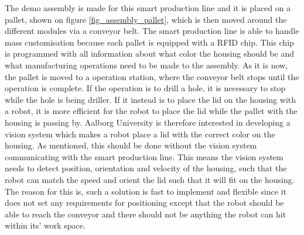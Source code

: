The demo assembly is made for this smart production line and it is placed on a pallet, shown on figure \ref{fig_assembly_pallet}, which is then moved around the different modules via a conveyor belt. The smart production line is able to handle mass customisation because each pallet is equipped with a RFID chip. This chip is programmed with all information about what color the housing should be and what manufacturing operations need to be made to the assembly. As it is now, the pallet is moved to a operation station, where the conveyor belt stops until the operation is complete. If the operation is to drill a hole, it is necessary to stop while the hole is being driller. If it instead is to place the lid on the housing with a robot, it is more efficient for the robot to place the lid while the pallet with the housing is passing by. Aalborg University is therefore interested in developing a vision system which makes a robot place a lid with the correct color on the housing. As mentioned, this should be done without the vision system communicating with the smart production line. This means the vision system needs to detect position, orientation and velocity of the housing, such that the robot can match the speed and orient the lid such that it will fit on the housing. The reason for this is, such a solution is fast to implement and flexible since it does not set any requirements for positioning except that the robot should be able to reach the conveyor and there should not be anything the robot can hit within its' work space.


